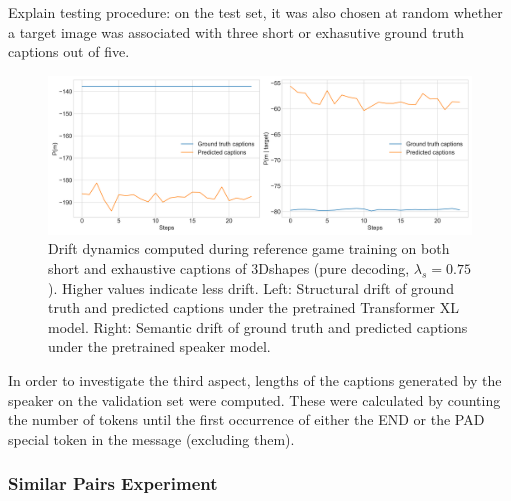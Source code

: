 Explain testing procedure: on the test set, it was also chosen at random whether a target image was associated with three short or exhasutive ground truth captions out of five. 


\begin{figure}
	\centering
	\includegraphics[width=\linewidth]{images/3dshapes_wShort_structural_semantic_drift_49_pure_075_random.png}
	\caption{Drift dynamics computed during reference game training on both short and exhaustive captions of 3Dshapes (pure decoding, $\lambda_s=0.75$). Higher values indicate less drift. Left: Structural drift of ground truth and predicted captions under the pretrained Transformer XL model. Right: Semantic drift of ground truth and predicted captions under the pretrained speaker model.}
	\label{fig:3dshapes_wShort_075_str_sem_drift}
\end{figure}


In order to investigate the third aspect, lengths of the captions generated by the speaker on the validation set were computed. These were calculated by counting the number of tokens until the first occurrence of either the END or the PAD special token in the message (excluding them). 

\subsubsection{Similar Pairs Experiment}

